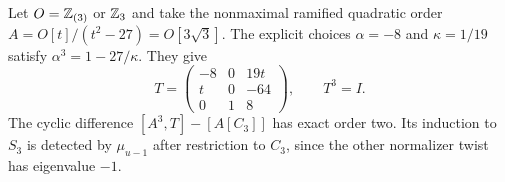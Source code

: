 \begin{example}\label{ex:cubic-quadratic-order}
Let $O=\mathbb Z_{(3)}$ or $\mathbb Z_3$ and take the nonmaximal ramified
quadratic order $A=O[t]/(t^2-27)=O[3\sqrt3]$.
The explicit choices $\alpha=-8$ and $\kappa=1/19$ satisfy
$\alpha^3=1-27/\kappa$.  They give
\[
 T=\begin{pmatrix}
 -8&0&19t\\
 t&0&-64\\
 0&1&8
 \end{pmatrix},\qquad T^3=I.
\]
The cyclic difference $[A^3,T]-[A[C_3]]$ has exact order two.
Its induction to $S_3$ is detected by $\mu_{u-1}$ after restriction
to $C_3$, since the other normalizer twist has eigenvalue $-1$.
\end{example}
